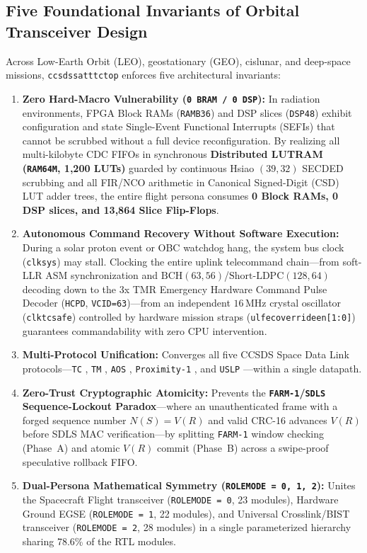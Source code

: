 \documentclass[10pt,a4paper]{article}
\renewcommand{\_}{\origunderscore\penalty0\hskip0pt\relax}
\numberwithin{equation}{section}
\numberwithin{table}{section}
\numberwithin{figure}{section}
\begin{document}
\subsection{Five Foundational Invariants of Orbital Transceiver Design}
Across Low-Earth Orbit (LEO), geostationary (GEO), cislunar, and deep-space missions, \texttt{ccsds\_sat\_ttc\_top} enforces five architectural invariants:
\begin{enumerate}\setlength{\itemsep}{2.5pt}
  \item \textbf{Zero Hard-Macro Vulnerability (\texttt{0 BRAM / 0 DSP}):} In radiation environments, FPGA Block RAMs (\texttt{RAMB36}) and DSP slices (\texttt{DSP48}) exhibit configuration and state Single-Event Functional Interrupts (SEFIs) that cannot be scrubbed without a full device reconfiguration. By realizing all multi-kilobyte CDC FIFOs in synchronous \textbf{Distributed LUTRAM (\texttt{RAM64M}, 1,200 LUTs)} guarded by continuous Hsiao $(39,32)$ SECDED scrubbing and all FIR/NCO arithmetic in Canonical Signed-Digit (CSD) LUT adder trees, the entire flight persona consumes \textbf{0 Block RAMs, 0 DSP slices, and 13,864 Slice Flip-Flops}.
  \item \textbf{Autonomous Command Recovery Without Software Execution:} During a solar proton event or OBC watchdog hang, the system bus clock (\texttt{clk\_sys}) may stall. Clocking the entire uplink telecommand chain—from soft-LLR ASM synchronization and $\text{BCH}(63,56)$/$\text{Short-LDPC}(128,64)$ decoding down to the 3x TMR Emergency Hardware Command Pulse Decoder (\texttt{HCPD}, \texttt{VCID=63})—from an independent $16\,\text{MHz}$ crystal oscillator (\texttt{clk\_tc\_safe}) controlled by hardware mission straps (\texttt{ul\_fec\_override\_en[1:0]}) guarantees commandability with zero CPU intervention.
  \item \textbf{Multi-Protocol Unification:} Converges all five CCSDS Space Data Link protocols—\texttt{TC} \cite{ccsds232}, \texttt{TM} \cite{ccsds132}, \texttt{AOS} \cite{ccsds732}, \texttt{Proximity-1} \cite{ccsds211}, and \texttt{USLP} \cite{ccsds7321}—within a single datapath.
  \item \textbf{Zero-Trust Cryptographic Atomicity:} Prevents the \textbf{\texttt{FARM-1}/\texttt{SDLS} Sequence-Lockout Paradox}—where an unauthenticated frame with a forged sequence number $N(S) = V(R)$ and valid CRC-16 advances $V(R)$ before SDLS MAC verification—by splitting \texttt{FARM-1} window checking (Phase~A) and atomic $V(R)$ commit (Phase~B) across a swipe-proof speculative rollback FIFO.
  \item \textbf{Dual-Persona Mathematical Symmetry (\texttt{ROLE\_MODE = 0, 1, 2}):} Unites the Spacecraft Flight transceiver (\texttt{ROLE\_MODE = 0}, 23 modules), Hardware Ground EGSE (\texttt{ROLE\_MODE = 1}, 22 modules), and Universal Crosslink/BIST transceiver (\texttt{ROLE\_MODE = 2}, 28 modules) in a single parameterized hierarchy sharing 78.6\% of the RTL modules.
\end{enumerate}
\end{document}
